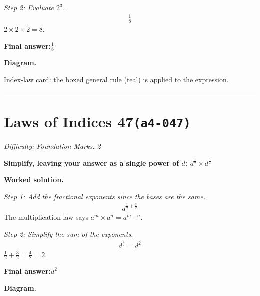 \documentclass[11pt]{article}
\newcommand{\question}[1]{\par\medskip\noindent\textbf{#1}\par}
\begin{document}
\textit{Step 2: Evaluate \( 2^3 \).}
\[\begin{gathered}
\frac{1}{8}
\end{gathered}\]
\( 2 \times 2 \times 2 = 8 \).

\begin{answerbox}
\textbf{Final answer:}\quad \(\displaystyle \frac{1}{8}\)
\end{answerbox}
\textbf{Diagram.}

\begin{center}
\end{center}
\small Index-law card: the boxed general rule (teal) is applied to the expression.\normalsize

\medskip\hrule

\section*{Laws of Indices 47\quad\small\texttt{(a4-047)}}
\textit{Difficulty: Foundation \quad\textbar\quad Marks: 2}

\question{Simplify, leaving your answer as a single power of \( d \): \( d^{\frac{1}{2}} \times d^{\frac{3}{2}} \)}

\textbf{Worked solution.}

\textit{Step 1: Add the fractional exponents since the bases are the same.}
\[\begin{gathered}
d^{\frac{1}{2}+\frac{3}{2}}
\end{gathered}\]
The multiplication law says \( a^m \times a^n = a^{m+n} \).

\textit{Step 2: Simplify the sum of the exponents.}
\[\begin{gathered}
d^{\frac{4}{2}} = d^{2}
\end{gathered}\]
\( \frac{1}{2} + \frac{3}{2} = \frac{4}{2} = 2 \).

\begin{answerbox}
\textbf{Final answer:}\quad \(\displaystyle d^{2}\)
\end{answerbox}
\textbf{Diagram.}
\end{document}
